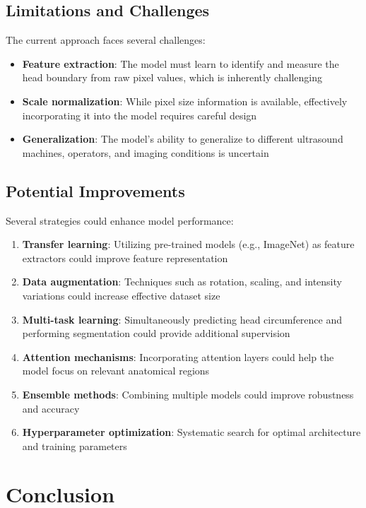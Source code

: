 \documentclass[conference]{IEEEtran}
\begin{document}
\subsection{Limitations and Challenges}

The current approach faces several challenges:
\begin{itemize}
    \item \textbf{Feature extraction}: The model must learn to identify and measure the head boundary from raw pixel values, which is inherently challenging
    \item \textbf{Scale normalization}: While pixel size information is available, effectively incorporating it into the model requires careful design
    \item \textbf{Generalization}: The model's ability to generalize to different ultrasound machines, operators, and imaging conditions is uncertain
\end{itemize}

\subsection{Potential Improvements}

Several strategies could enhance model performance:
\begin{enumerate}
    \item \textbf{Transfer learning}: Utilizing pre-trained models (e.g., ImageNet) as feature extractors could improve feature representation
    \item \textbf{Data augmentation}: Techniques such as rotation, scaling, and intensity variations could increase effective dataset size
    \item \textbf{Multi-task learning}: Simultaneously predicting head circumference and performing segmentation could provide additional supervision
    \item \textbf{Attention mechanisms}: Incorporating attention layers could help the model focus on relevant anatomical regions
    \item \textbf{Ensemble methods}: Combining multiple models could improve robustness and accuracy
    \item \textbf{Hyperparameter optimization}: Systematic search for optimal architecture and training parameters
\end{enumerate}

\section{Conclusion}
\end{document}

